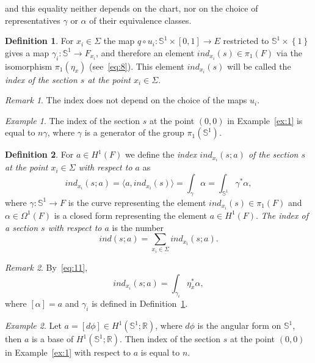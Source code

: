 \documentclass[12pt,letterpaper]{amsart}
\theoremstyle{definition}
\newtheorem{df}{Definition}
\theoremstyle{plain}
\theoremstyle{remark}
\newtheorem{ex}{Example}
\newtheorem{rem}{Remark}
\begin{document}
and this equality neither depends on the chart, nor on the choice of representatives $\gamma$ or $\alpha$ of their equivalence classes.
\begin{df}
For $x_i \in \Sigma$ the map $q \circ u_i : \mathbb{S}^1 \times [0, 1] \to E$ restricted to $\mathbb{S}^1 \times \left\{ 1 \right\}$ gives a map $\gamma_i : \mathbb{S}^1 \to F_{x_i}$, and therefore an element $ind_{x_i}(s) \in \pi_1(F)$ via the isomorphism $\pi_1(\eta_x)$ (see~\eqref{eq:8}).
This element $ind_{x_i}(s)$ will be called the \emph{index of the section $s$ at the point $x_i \in \Sigma$}.
\label{df:1}
\end{df}
\begin{rem}
The index does not depend on the choice of the maps $u_i$.
\label{rem:3}
\end{rem}
\begin{ex}
The index of the section $s$ at the point $(0, 0)$ in Example~\ref{ex:1} is equal to $n \gamma$, where $\gamma$ is a generator of the group $\pi_1(\mathbb{S}^1)$.
\label{ex:2}
\end{ex}
\begin{df}
For $a \in H^1(F)$ we define the \emph{index $ind_{x_i}(s;a)$ of the section $s$ at the point $x_i \in \Sigma$ with respect to $a$} as
\begin{equation}
ind_{x_i}(s;a) = \langle a, ind_{x_i}(s) \rangle = \int_\gamma \alpha = \int_{\mathbb{S}^1} \gamma^* \alpha,
\label{eq:11}
\end{equation}
where $\gamma : \mathbb{S}^1 \to F$ is the curve representing the element $ind_{x_i}(s) \in \pi_1(F)$ and $\alpha \in \Omega^1(F)$ is a closed form representing the element $a \in H^1(F)$.
\emph{The index of a section $s$ with respect to $a$} is the number
\begin{equation}
ind(s; a) = \sum_{x_i \in \Sigma} ind_{x_i}(s;a).
\label{eq:12}
\end{equation}
\label{df:2}
\end{df}
\begin{rem}
By~\eqref{eq:11},
\begin{equation}
ind_{x_i}(s;a) = \int_{\gamma_i} \eta_x^*\alpha,
\label{eq:13}
\end{equation}
where $[\alpha] = a$ and $\gamma_i$ is defined in Definition~\ref{df:1}.
\label{rem:4}
\end{rem}
\begin{ex}
Let $a = [ d\phi ] \in H^1(\mathbb{S}^1; \mathbb{R})$, where $d\phi$ is the angular form on $\mathbb{S}^1$, then $a$ is a base of $H^1(\mathbb{S}^1; \mathbb{R})$.
Then index of the section $s$ at the point $(0, 0)$ in Example~\ref{ex:1} with respect to $a$ is equal to $n$.
\label{ex:3}
\end{ex}
\end{document}
